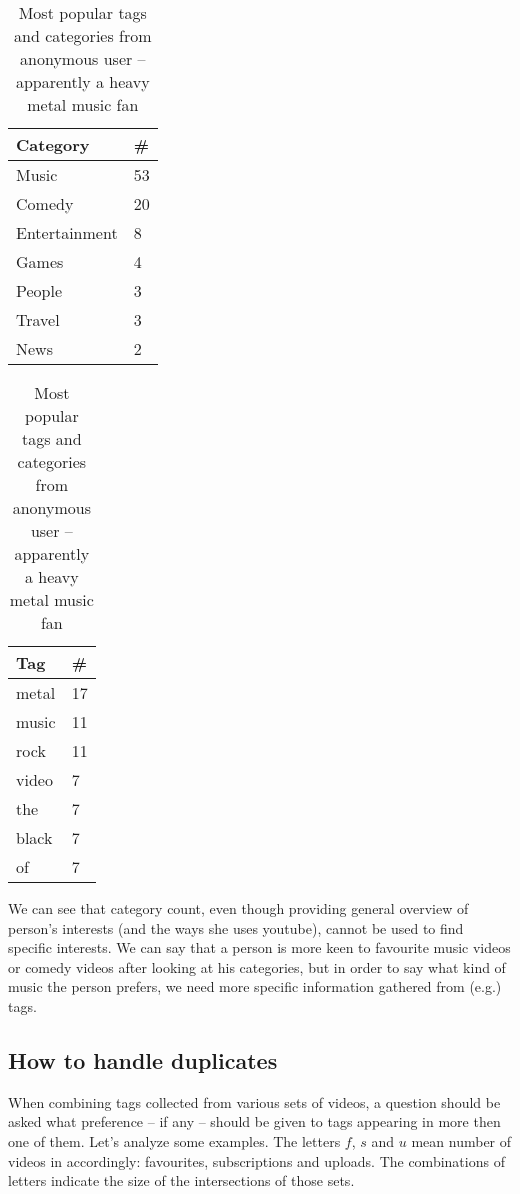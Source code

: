 \begin{table}[ht]
\begin{minipage}[b]{0.5\linewidth}\centering

\begin{tabular}{| l | l |}
Category & \# \\ \hline
Music & 53 \\
Comedy & 20 \\
Entertainment & 8 \\
Games & 4 \\
People & 3 \\
Travel & 3 \\
News & 2 \\
\end{tabular}

\end{minipage}
\hspace{0.5cm}
\begin{minipage}[b]{0.5\linewidth}
\centering

\begin{tabular}{| l | l |}
Tag & \# \\ \hline
metal & 17 \\
music & 11 \\
rock & 11 \\
video & 7 \\
the & 7 \\
black & 7 \\
of & 7 \\
\end{tabular}

\end{minipage}

\caption{Most popular tags and categories from anonymous user -- apparently a
heavy metal music fan}
\end{table}

We can see that category count, even though providing general overview of
person's interests (and the ways she uses youtube), cannot be used to find
specific interests. We can say that a person is more keen to
favourite music videos or comedy videos after looking at his categories, but in
order to say what kind of music the person prefers, we need more specific
information gathered from (e.g.) tags.

\subsection{How to handle duplicates}

When combining tags collected from various sets of videos, a question should be
asked what preference -- if any -- should be given to tags appearing in more
then one of them. Let's analyze some examples. The letters $f$, $s$ and $u$ mean number
of videos in accordingly: favourites, subscriptions and uploads. The
combinations of letters indicate the size of the intersections of those sets. \\

